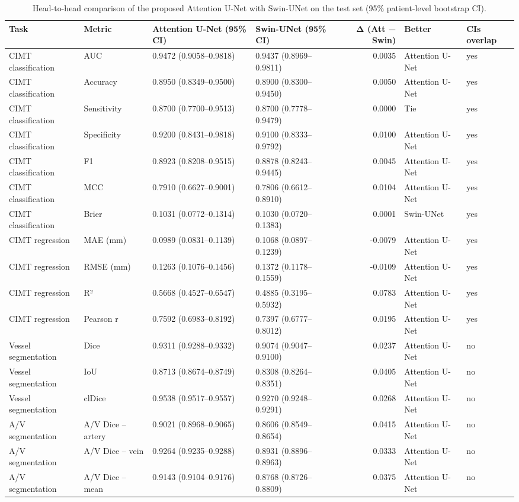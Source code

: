 \begin{table}
\caption{Head-to-head comparison of the proposed Attention U-Net with Swin-UNet on the test set (95\% patient-level bootstrap CI).}
\label{tab:head_to_head_att_vs_swin}
\begin{tabular}{llllrll}
\toprule
Task & Metric & Attention U-Net (95\% CI) & Swin-UNet (95\% CI) & Δ (Att − Swin) & Better & CIs overlap \\
\midrule
CIMT classification & AUC & 0.9472 (0.9058–0.9818) & 0.9437 (0.8969–0.9811) & 0.0035 & Attention U-Net & yes \\
CIMT classification & Accuracy & 0.8950 (0.8349–0.9500) & 0.8900 (0.8300–0.9450) & 0.0050 & Attention U-Net & yes \\
CIMT classification & Sensitivity & 0.8700 (0.7700–0.9513) & 0.8700 (0.7778–0.9479) & 0.0000 & Tie & yes \\
CIMT classification & Specificity & 0.9200 (0.8431–0.9818) & 0.9100 (0.8333–0.9792) & 0.0100 & Attention U-Net & yes \\
CIMT classification & F1 & 0.8923 (0.8208–0.9515) & 0.8878 (0.8243–0.9445) & 0.0045 & Attention U-Net & yes \\
CIMT classification & MCC & 0.7910 (0.6627–0.9001) & 0.7806 (0.6612–0.8910) & 0.0104 & Attention U-Net & yes \\
CIMT classification & Brier & 0.1031 (0.0772–0.1314) & 0.1030 (0.0720–0.1383) & 0.0001 & Swin-UNet & yes \\
CIMT regression & MAE (mm) & 0.0989 (0.0831–0.1139) & 0.1068 (0.0897–0.1239) & -0.0079 & Attention U-Net & yes \\
CIMT regression & RMSE (mm) & 0.1263 (0.1076–0.1456) & 0.1372 (0.1178–0.1559) & -0.0109 & Attention U-Net & yes \\
CIMT regression & R² & 0.5668 (0.4527–0.6547) & 0.4885 (0.3195–0.5932) & 0.0783 & Attention U-Net & yes \\
CIMT regression & Pearson r & 0.7592 (0.6983–0.8192) & 0.7397 (0.6777–0.8012) & 0.0195 & Attention U-Net & yes \\
Vessel segmentation & Dice & 0.9311 (0.9288–0.9332) & 0.9074 (0.9047–0.9100) & 0.0237 & Attention U-Net & no \\
Vessel segmentation & IoU & 0.8713 (0.8674–0.8749) & 0.8308 (0.8264–0.8351) & 0.0405 & Attention U-Net & no \\
Vessel segmentation & clDice & 0.9538 (0.9517–0.9557) & 0.9270 (0.9248–0.9291) & 0.0268 & Attention U-Net & no \\
A/V segmentation & A/V Dice – artery & 0.9021 (0.8968–0.9065) & 0.8606 (0.8549–0.8654) & 0.0415 & Attention U-Net & no \\
A/V segmentation & A/V Dice – vein & 0.9264 (0.9235–0.9288) & 0.8931 (0.8896–0.8963) & 0.0333 & Attention U-Net & no \\
A/V segmentation & A/V Dice – mean & 0.9143 (0.9104–0.9176) & 0.8768 (0.8726–0.8809) & 0.0375 & Attention U-Net & no \\
\bottomrule
\end{tabular}
\end{table}

